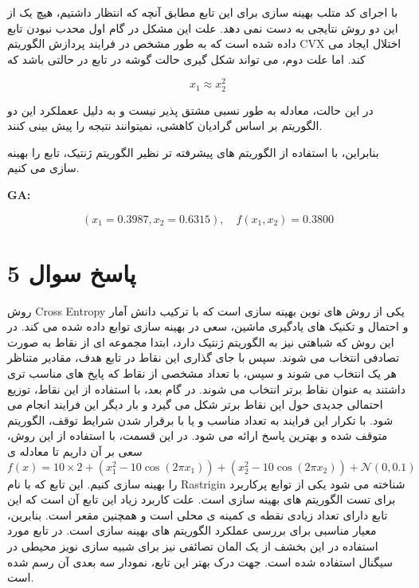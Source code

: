 با اجرای کد متلب بهینه سازی برای این تابع مطابق آنچه که انتظار داشتیم، هیچ یک از این دو روش نتایجی به دست نمی دهد. علت این مشکل در گام اول محدب نبودن تابع داده شده است که به طور مشخص در فرایند پردازش الگوریتم 
CVX
اختلال ایجاد می کند. اما علت دوم، می تواند شکل گیری حالت گوشه در تابع در حالتی باشد که 

\[
x_1 \approx x_2^2
\]

در این حالت، معادله به طور نسبی مشتق پذیر نیست و به دلیل ععملکرد این دو الگوریتم بر اساس گرادیان کاهشی، نمیتوانند نتیجه را پیش بینی کنند.

بنابراین، با استفاده از الگوریتم های پیشرفته تر نظیر الگوریتم ژنتیک، تابع را بهینه سازی می کنیم.
 


   \textbf{GA:}

 \[
 (x_1 = 0.3987, x_2 = 0.6315) , \quad f(x_1, x_2) = 0.3800
 \]
 
 
 \section{پاسخ سوال 5}
روش 
 Cross Entropy
 یکی از روش های نوین بهینه سازی است که با ترکیب دانش آمار و احتمال و تکنیک های یادگیری ماشین، 
 سعی در بهینه سازی توابع داده شده می کند. در این روش که شباهتی نیز به الگوریتم ژنتیک دارد، ابتدا مجموعه ای از نقاط به صورت تصادفی انتخاب می شوند. سپس با جای گذاری این نقاط در تابع هدف، مقادیر متناظر هر یک انتخاب می شوند و سپس، با تعداد مشخصی از نقاط که پایخ های مناسب تری داشتند به عنوان نقاط برتر انتخاب می شوند. در گام بعد، با استفاده از این نقاط، توزیع احتمالی جدیدی حول این نقاط برتر شکل می گیرد و بار دیگر این فرایند انجام می شود. با تکرار این فرایند به تعداد مناسب و یا با برقرار شدن شرایط توقف، الگوریتم متوقف شده و بهترین پاسخ ارائه می شود.
 در این قسمت، با استفاده از این روش، سعی بر آن داریم تا معادله ی 
 \[
 f(x) = 10 \times 2 + \left( x_1^2 - 10 \cos(2 \pi x_1) \right) + \left( x_2^2 - 10 \cos(2 \pi x_2) \right) + \mathcal{N}(0, 0.1)
 \]
 را بهینه سازی کنیم. این تابع که با نام 
 Rastrigin
 شناخته می شود یکی از توابع پرکاربرد برای تست الگوریتم های بهینه سازی است. علت کاربرد زیاد این تابع آن است که این تابع دارای تعداد زیادی نقطه ی کمینه ی محلی است و همچنین مقعر است. بنابرین، معیار مناسبی برای بررسی عملکرد الگوریتم های بهینه سازی است.
 در تابع مورد استفاده در این بخشف از یک المان تصائفی نیز برای شبیه سازی نویز محیطی در سیگنال استفاده شده است.
 جهت درک بهتر این تابع، نمودار سه بعدی آن رسم شده است.
 


